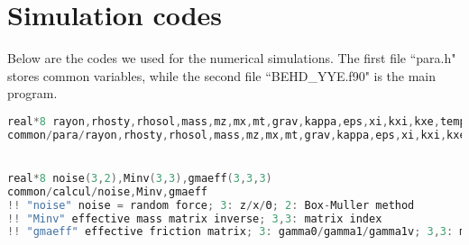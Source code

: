 \documentclass[fleqn,10pt]{InternshipReport_SI-ENS-PSL}
\begin{document}
\section*{Simulation codes}

Below are the codes we used for the numerical simulations. The first file ``para.h" stores common variables, while the second file ``BEHD\_YYE.f90" is the main program.


\footnotesize
\begin{lstlisting}[language=h, caption=para.h]
real*8 rayon,rhosty,rhosol,mass,mz,mx,mt,grav,kappa,eps,xi,kxi,kxe,temp,k_B,beta,clight,dt
common/para/rayon,rhosty,rhosol,mass,mz,mx,mt,grav,kappa,eps,xi,kxi,kxe,temp,k_B,beta,clight,dt


real*8 noise(3,2),Minv(3,3),gmaeff(3,3,3)
common/calcul/noise,Minv,gmaeff
!! "noise" noise = random force; 3: z/x/Θ; 2: Box-Muller method
!! "Minv" effective mass matrix inverse; 3,3: matrix index
!! "gmaeff" effective friction matrix; 3: gamma0/gamma1/gamma1v; 3,3: matrix index
\end{lstlisting}
\end{document}

